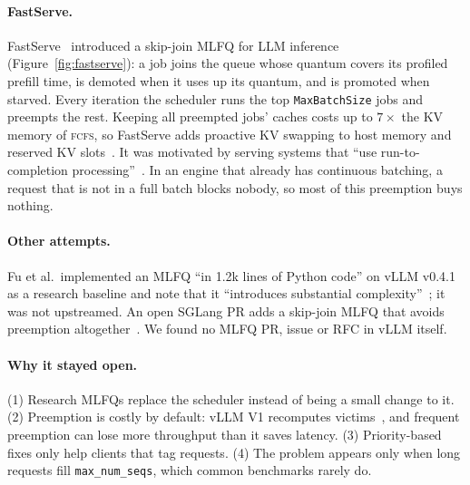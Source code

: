 \documentclass[11pt]{article}
\newcommand{\fcfs}{\textsc{fcfs}}
\newcommand{\maxseqs}{\texttt{max\_num\_seqs}}
\begin{document}
\paragraph{FastServe.} FastServe~\cite{fastserve,fastserve-nsdi} introduced a skip-join MLFQ for LLM
inference (Figure~\ref{fig:fastserve}): a job joins the queue whose quantum covers its profiled
prefill time, is demoted when it uses up its quantum, and is promoted when starved. Every iteration
the scheduler runs the top \texttt{MaxBatchSize} jobs and preempts the rest. Keeping all preempted
jobs' caches costs up to $7\times$ the KV memory of \fcfs{}, so FastServe adds proactive KV swapping
to host memory and reserved KV slots~\cite{fastserve-nsdi}. It was motivated by serving systems
that ``use run-to-completion processing''~\cite{fastserve-nsdi}. In an engine that already has
continuous batching, a request that is not in a full batch blocks nobody, so most of this preemption
buys nothing.

\paragraph{Other attempts.} Fu et al.\ implemented an MLFQ ``in 1.2k lines of Python code'' on
vLLM v0.4.1 as a research baseline and note that it ``introduces substantial
complexity''~\cite{ltr}; it was not upstreamed. An open SGLang PR adds a skip-join MLFQ that avoids
preemption altogether~\cite{sglang45688}. We found no MLFQ PR, issue or RFC in vLLM itself.

\paragraph{Why it stayed open.} (1) Research MLFQs replace the scheduler instead of being a small
change to it. (2) Preemption is costly by default: vLLM V1 recomputes victims~\cite{vllm-opt}, and
frequent preemption can lose more throughput than it saves latency. (3) Priority-based fixes only
help clients that tag requests. (4) The problem appears only when long requests fill \maxseqs{},
which common benchmarks rarely do.
\end{document}

